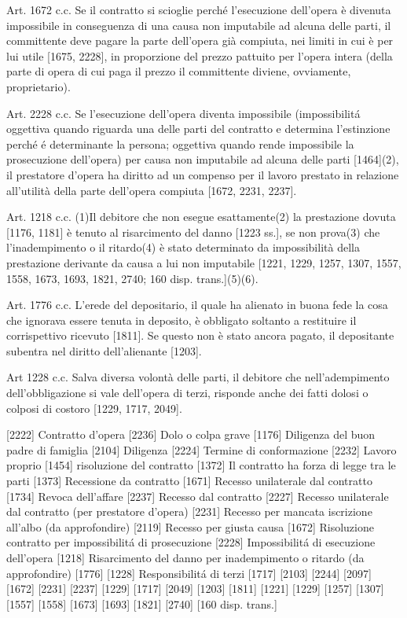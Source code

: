 \documentclass{article}
\begin{document}
Art. 1672 c.c. Se il contratto si scioglie perché l'esecuzione dell'opera è divenuta impossibile in conseguenza di una causa non imputabile ad alcuna delle parti, il committente deve pagare la parte dell'opera già compiuta, nei limiti in cui è per lui utile [1675, 2228], in proporzione del prezzo pattuito per l'opera intera (della parte di opera di cui paga il prezzo il committente diviene, ovviamente, proprietario).

Art. 2228 c.c. Se l'esecuzione dell'opera diventa impossibile (impossibilit\'a oggettiva quando riguarda una delle parti del contratto e determina l'estinzione perch\'e \'e determinante la persona; oggettiva quando rende impossibile la prosecuzione dell'opera) per causa non imputabile ad alcuna delle parti [1464](2), il prestatore d'opera ha diritto ad un compenso per il lavoro prestato in relazione all'utilità della parte dell'opera compiuta [1672, 2231, 2237].

Art. 1218 c.c. (1)Il debitore che non esegue esattamente(2) la prestazione dovuta [1176, 1181] è tenuto al risarcimento del danno [1223 ss.], se non prova(3) che l'inadempimento o il ritardo(4) è stato determinato da impossibilità della prestazione derivante da causa a lui non imputabile [1221, 1229, 1257, 1307, 1557, 1558, 1673, 1693, 1821, 2740; 160 disp. trans.](5)(6).

Art. 1776 c.c. L'erede del depositario, il quale ha alienato in buona fede la cosa che ignorava essere tenuta in deposito, è obbligato soltanto a restituire il corrispettivo ricevuto [1811]. Se questo non è stato ancora pagato, il depositante subentra nel diritto dell'alienante [1203]. 

Art 1228 c.c. Salva diversa volontà delle parti, il debitore che nell'adempimento dell'obbligazione si vale dell'opera di terzi, risponde anche dei fatti dolosi o colposi di costoro [1229, 1717, 2049].

[2222] Contratto d'opera
[2236] Dolo o colpa grave
[1176] Diligenza del buon padre di famiglia
[2104] Diligenza
[2224] Termine di conformazione
[2232] Lavoro proprio
[1454] risoluzione del contratto
[1372] Il contratto ha forza di legge tra le parti
[1373] Recessione da contratto
[1671] Recesso unilaterale dal contratto
[1734] Revoca dell'affare
[2237] Recesso dal contratto
[2227] Recesso unilaterale dal contratto (per prestatore d'opera)
[2231] Recesso per mancata iscrizione all'albo (da approfondire)
[2119] Recesso per giusta causa
[1672] Risoluzione contratto per impossibilit\'a di prosecuzione
[2228] Impossibilit\'a di esecuzione dell'opera
[1218] Risarcimento del danno per inadempimento o ritardo (da approfondire)
[1776] 
[1228] Responsibilit\'a di terzi
[1717]
[2103]
[2244]
[2097]
[1672]
[2231]
[2237]
[1229]
[1717]
[2049]
[1203]
[1811]
[1221]
[1229]
[1257]
[1307] 
[1557]
[1558]
[1673]
[1693]
[1821]
[2740]
[160 disp. trans.]
\end{document}
